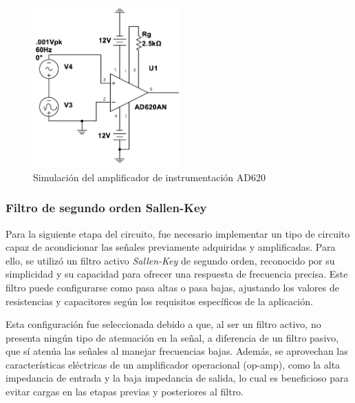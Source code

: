             \begin{figure}[H]
                \centering
                \includegraphics[width=0.5\textwidth]{img/Desarrollo/multisim_AD620AN.png}
                \caption[Simulación del amplificador de instrumentación AD620.]{Simulación del amplificador de instrumentación AD620\footnotemark}
                \label{fig:Simulacion_AD620}
            \end{figure}

        \subsubsection{Filtro de segundo orden Sallen-Key}
            Para la siguiente etapa del circuito, fue necesario implementar un tipo de circuito capaz de acondicionar las señales previamente adquiridas y amplificadas. Para ello, se utilizó un filtro activo \textit{Sallen-Key} de segundo orden, reconocido por su simplicidad y su capacidad para ofrecer una respuesta de frecuencia precisa. Este filtro puede configurarse como pasa altas o pasa bajas, ajustando los valores de resistencias y capacitores según los requisitos específicos de la aplicación.

            Esta configuración fue seleccionada debido a que, al ser un filtro activo, no presenta ningún tipo de atenuación en la señal, a diferencia de un filtro pasivo, que sí atenúa las señales al manejar frecuencias bajas. Además, se aprovechan las características eléctricas de un amplificador operacional (op-amp), como la alta impedancia de entrada y la baja impedancia de salida, lo cual es beneficioso para evitar cargas en las etapas previas y posteriores al filtro.
        
